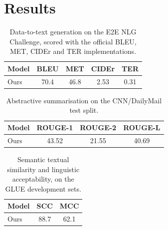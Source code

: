 \documentclass{article}
\begin{document}
\section{Results}

\begin{table}
\caption{Data-to-text generation on the E2E NLG Challenge, scored with the
official BLEU, MET, CIDEr and TER implementations.}
\begin{tabular}{lcccc}
Model & BLEU & MET & CIDEr & TER \\
\hline
Ours & 70.4 & 46.8 & 2.53 & 0.31 \\
\end{tabular}
\end{table}

\begin{table}
\begin{tabular}{lccc}
Model & ROUGE-1 & ROUGE-2 & ROUGE-L \\
\hline
Ours & 43.52 & 21.55 & 40.69 \\
\end{tabular}
\caption{Abstractive summarisation on the CNN/DailyMail test split.}
\end{table}

\begin{table}
\begin{tabular}{lcc}
Model & SCC & MCC \\
\hline
Ours & 88.7 & 62.1 \\
\end{tabular}
\caption{Semantic textual similarity and linguistic acceptability, on the GLUE
development sets.}
\end{table}
\end{document}
